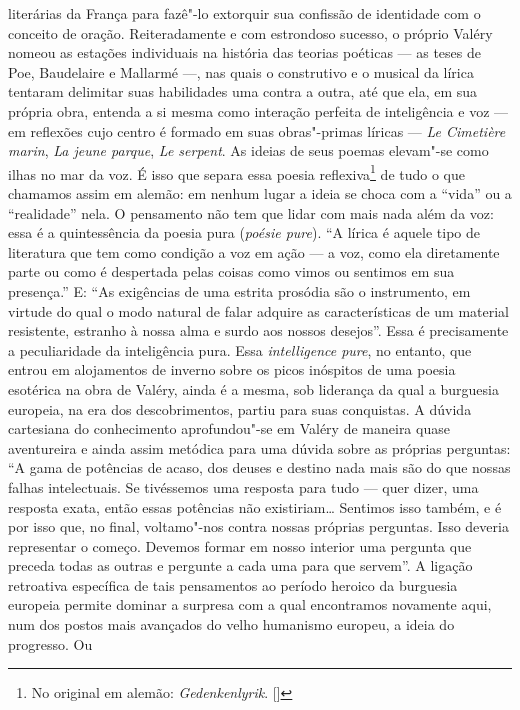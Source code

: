 literárias da França para fazê"-lo extorquir sua confissão de identidade
com o conceito de oração. Reiteradamente e com estrondoso sucesso, o
próprio Valéry nomeou as estações individuais na história das teorias
poéticas --- as teses de Poe, Baudelaire e Mallarmé ---, nas quais o
construtivo e o musical da lírica tentaram delimitar suas habilidades
uma contra a outra, até que ela, em sua própria obra, entenda a si mesma
como interação perfeita de inteligência e voz --- em reflexões cujo centro
é formado em suas obras"-primas líricas --- \emph{Le Cimetière marin}, \emph{La jeune
parque}, \emph{Le serpent}. As ideias de seus poemas elevam"-se como ilhas no
mar da voz. É isso que separa essa poesia reflexiva\footnote{No original em alemão: \emph{Gedenkenlyrik}. []}
de tudo o que chamamos assim em alemão: em nenhum
lugar a ideia se choca com a ``vida'' ou a ``realidade'' nela. O pensamento
não tem que lidar com mais nada além da voz: essa é a quintessência da
poesia pura (\emph{poésie pure}). ``A lírica é aquele tipo de literatura
que tem como condição a voz em ação --- a voz, como ela diretamente parte
ou como é despertada pelas coisas como vimos ou sentimos em sua
presença.'' E: ``As exigências de uma estrita prosódia são o instrumento, em
virtude do qual o modo natural de falar adquire as características de um
material resistente, estranho à nossa alma e surdo aos nossos desejos''.
Essa é precisamente a peculiaridade da inteligência pura. Essa
\emph{intelligence pure}, no entanto, que entrou em alojamentos de
inverno sobre os picos inóspitos de uma poesia esotérica na obra de
Valéry, ainda é a mesma, sob liderança da qual a burguesia europeia, na
era dos descobrimentos, partiu para suas conquistas. A dúvida cartesiana
do conhecimento aprofundou"-se em Valéry de maneira quase aventureira e
ainda assim metódica para uma dúvida sobre as próprias perguntas: ``A
gama de potências de acaso, dos deuses e destino nada mais são do que
nossas falhas intelectuais. Se tivéssemos uma resposta para tudo ---
quer dizer, uma resposta exata, então essas potências não existiriam\ldots{}
Sentimos isso também, e é por isso que, no final, voltamo"-nos contra
nossas próprias perguntas. Isso deveria representar o começo. Devemos
formar em nosso interior uma pergunta que preceda todas as outras e
pergunte a cada uma para que servem''. A ligação retroativa específica
de tais pensamentos ao período heroico da burguesia europeia permite
dominar a surpresa com a qual encontramos novamente aqui, num dos postos
mais avançados do velho humanismo europeu, a ideia do progresso. Ou
